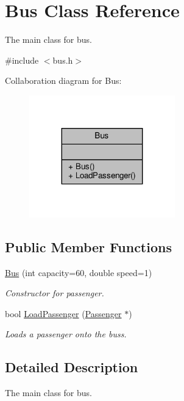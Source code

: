 \hypertarget{classBus}{}\section{Bus Class Reference}
\label{classBus}


The main class for bus.  




{\ttfamily \#include $<$bus.\+h$>$}



Collaboration diagram for Bus\+:\nopagebreak
\begin{figure}[H]
\begin{center}
\leavevmode
\includegraphics[width=179pt]{classBus__coll__graph}
\end{center}
\end{figure}
\subsection*{Public Member Functions}
\begin{DoxyCompactItemize}
\item 
\hyperlink{classBus_a8a34b953fea6c227c1b2d1102e2ca37b}{Bus} (int capacity=60, double speed=1)
\begin{DoxyCompactList}\small\item\em Constructor for passenger. \end{DoxyCompactList}\item 
bool \hyperlink{classBus_ac3f1c523bc4f97bc8ada8dc488ab3484}{Load\+Passenger} (\hyperlink{classPassenger}{Passenger} $\ast$)
\begin{DoxyCompactList}\small\item\em Loads a passenger onto the buss. \end{DoxyCompactList}\end{DoxyCompactItemize}


\subsection{Detailed Description}
The main class for bus. 

